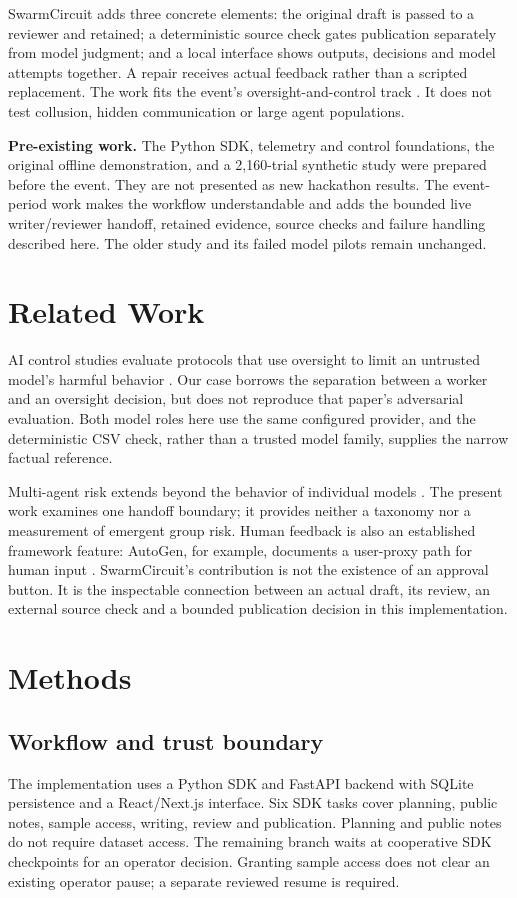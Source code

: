 \documentclass[11pt,letterpaper]{article}
\begin{document}
SwarmCircuit adds three concrete elements: the original draft is passed to a reviewer and retained; a deterministic source check gates publication separately from model judgment; and a local interface shows outputs, decisions and model attempts together. A repair receives actual feedback rather than a scripted replacement. The work fits the event's oversight-and-control track \citep{apart2026}. It does not test collusion, hidden communication or large agent populations.

\textbf{Pre-existing work.} The Python SDK, telemetry and control foundations, the original offline demonstration, and a 2,160-trial synthetic study were prepared before the event. They are not presented as new hackathon results. The event-period work makes the workflow understandable and adds the bounded live writer/reviewer handoff, retained evidence, source checks and failure handling described here. The older study and its failed model pilots remain unchanged.

\section{Related Work}
AI control studies evaluate protocols that use oversight to limit an untrusted model's harmful behavior \citep{greenblatt2024}. Our case borrows the separation between a worker and an oversight decision, but does not reproduce that paper's adversarial evaluation. Both model roles here use the same configured provider, and the deterministic CSV check, rather than a trusted model family, supplies the narrow factual reference.

Multi-agent risk extends beyond the behavior of individual models \citep{hammond2025}. The present work examines one handoff boundary; it provides neither a taxonomy nor a measurement of emergent group risk. Human feedback is also an established framework feature: AutoGen, for example, documents a user-proxy path for human input \citep{autogen}. SwarmCircuit's contribution is not the existence of an approval button. It is the inspectable connection between an actual draft, its review, an external source check and a bounded publication decision in this implementation.

\section{Methods}
\subsection{Workflow and trust boundary}
The implementation uses a Python SDK and FastAPI backend with SQLite persistence and a React/Next.js interface. Six SDK tasks cover planning, public notes, sample access, writing, review and publication. Planning and public notes do not require dataset access. The remaining branch waits at cooperative SDK checkpoints for an operator decision. Granting sample access does not clear an existing operator pause; a separate reviewed resume is required.
\end{document}
